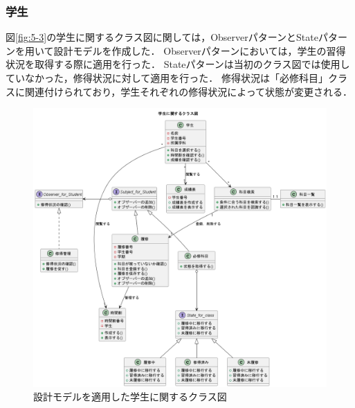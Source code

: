 \documentclass[documentclass]{jsarticle}
\begin{document}
\subsubsection*{学生}
図\ref*{fig:5-3}の学生に関するクラス図に関しては，ObserverパターンとStateパターンを用いて設計モデルを作成した．
Observerパターンにおいては，学生の習得状況を取得する際に適用を行った．
Stateパターンは当初のクラス図では使用していなかった，修得状況に対して適用を行った．
修得状況は「必修科目」クラスに関連付けられており，学生それぞれの修得状況によって状態が変更される．
\begin{figure}[H]
  \begin{center}
    \includegraphics*[scale=0.4]{figure/9-3.png}
  \end{center}
  \caption{設計モデルを適用した学生に関するクラス図}
  \label{fig:9-3}
\end{figure}
\end{document}
